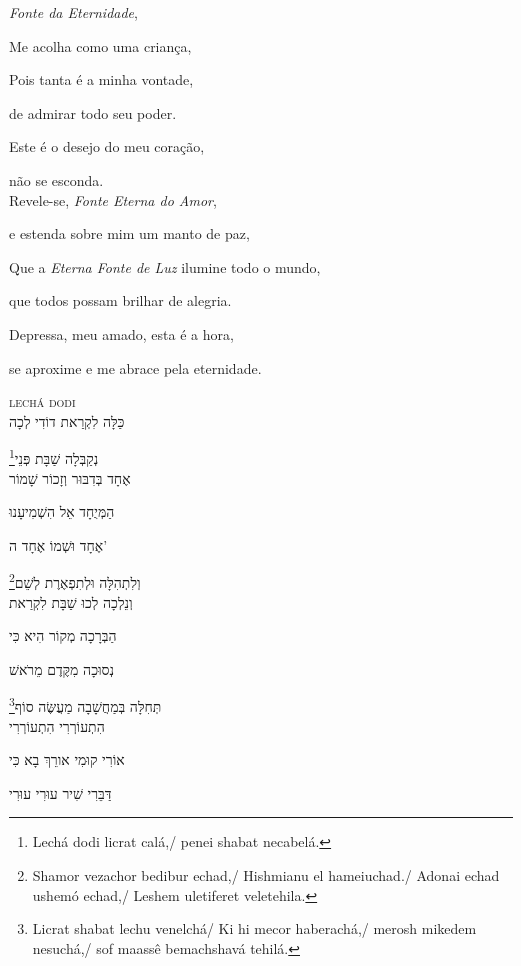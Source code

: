 \emph{Fonte da Eternidade},

Me acolha como uma criança,

Pois tanta é a minha vontade,

de admirar todo seu poder.

Este é o desejo do meu coração,

não se esconda.\\[10pt]

Revele-se, \emph{Fonte Eterna do Amor},

e estenda sobre mim um manto de paz,

Que a \emph{Eterna Fonte de Luz} ilumine todo o mundo,

que todos possam brilhar de alegria.

Depressa, meu amado, esta é a hora,

se aproxime e me abrace pela eternidade.

\movetoevenpage
\raggedleft
{}

\vspace*{1cm}

\textsc{lechá dodi}\\[15pt]

כַּלָּה לִקְרַאת דוֹדִי לְכָה

נְקַבְּלָה שַׁבָּת פְּנֵי\footnote{Lechá dodi licrat calá,/ penei shabat necabelá.}\\[10pt]

אֶחָד בְּדִבּוּר וְזָכוֹר שָׁמוֹר

הַמְּיֻחָד אֵל הִשְׁמִיעָנוּ

אֶחָד וּשְׁמוֹ אֶחָד ה' 

וְלִתְהִלָּה וּלְתִפְאֶרֶת לְשֵׁם\footnote{Shamor vezachor bedibur echad,/ Hishmianu el hameiuchad./ Adonai echad ushemó echad,/ Leshem uletiferet veletehila.}\\[10pt]

וְנֵלְכָה לְכוּ שַׁבָּת לִקְרַאת

הַבְּרָכָה מְקוֹר הִיא כִּי

נְסוּכָה מִקֶּדֶם מֵרֹאשׁ 

תְּחִלָּה בְּמַחֲשָׁבָה מַעֲשֶּׂה סוֹף\footnote{Licrat shabat lechu venelchá/ Ki hi mecor haberachá,/ merosh mikedem nesuchá,/ sof maassê bemachshavá tehilá.}\\[10pt]

הִתְעוֹרְרִי הִתְעוֹרְרִי

אוֹרִי קוּמִי אורֵךְ בָא כִּי

דַּבֵּרִי שִׁיר עוּרִי עוּרִי

